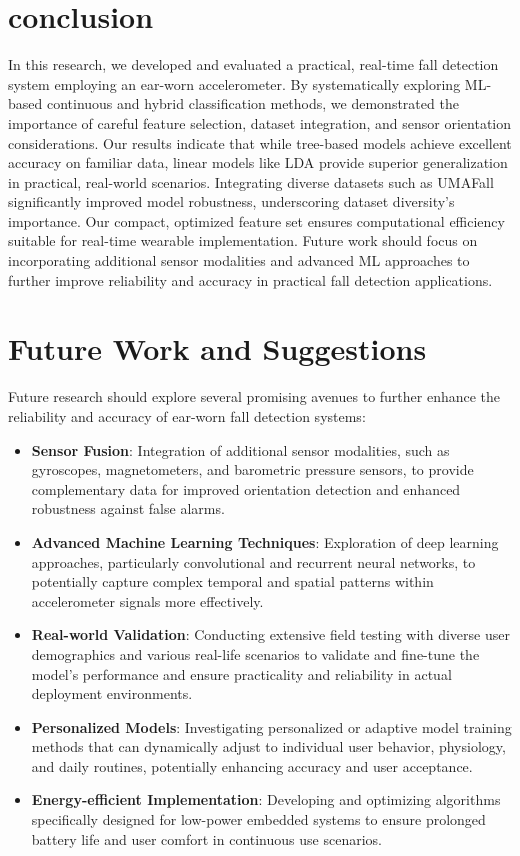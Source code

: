 \documentclass[conference]{IEEEtran}
\begin{document}
\section{conclusion}
In this research, we developed and evaluated a practical, real-time fall detection system employing an ear-worn accelerometer. By systematically exploring ML-based continuous and hybrid classification methods, we demonstrated the importance of careful feature selection, dataset integration, and sensor orientation considerations. Our results indicate that while tree-based models achieve excellent accuracy on familiar data, linear models like LDA provide superior generalization in practical, real-world scenarios. Integrating diverse datasets such as UMAFall significantly improved model robustness, underscoring dataset diversity's importance. Our compact, optimized feature set ensures computational efficiency suitable for real-time wearable implementation. Future work should focus on incorporating additional sensor modalities and advanced ML approaches to further improve reliability and accuracy in practical fall detection applications.


\section{Future Work and Suggestions}

Future research should explore several promising avenues to further enhance the reliability and accuracy of ear-worn fall detection systems:

\begin{itemize}
\item \textbf{Sensor Fusion}: Integration of additional sensor modalities, such as gyroscopes, magnetometers, and barometric pressure sensors, to provide complementary data for improved orientation detection and enhanced robustness against false alarms.
\item \textbf{Advanced Machine Learning Techniques}: Exploration of deep learning approaches, particularly convolutional and recurrent neural networks, to potentially capture complex temporal and spatial patterns within accelerometer signals more effectively.
\item \textbf{Real-world Validation}: Conducting extensive field testing with diverse user demographics and various real-life scenarios to validate and fine-tune the model's performance and ensure practicality and reliability in actual deployment environments.
\item \textbf{Personalized Models}: Investigating personalized or adaptive model training methods that can dynamically adjust to individual user behavior, physiology, and daily routines, potentially enhancing accuracy and user acceptance.
\item \textbf{Energy-efficient Implementation}: Developing and optimizing algorithms specifically designed for low-power embedded systems to ensure prolonged battery life and user comfort in continuous use scenarios.
\end{itemize}
\end{document}
